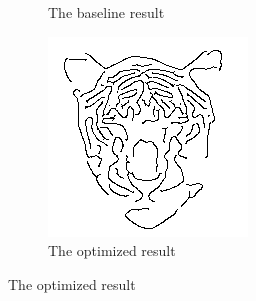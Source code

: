 \documentclass[10pt,final,journal]{IEEEtran}
\begin{document}
\begin{figure}[h!]
\begin{subfigure}[b]{0.3\textwidth}
            \caption{The baseline result}
            \label{fig:app_tiger_baseline}
    \end{subfigure}
    \begin{subfigure}[b]{0.3\textwidth}
            \includegraphics[width=\textwidth]{tiger_out}
            \caption{The optimized result}
            \label{fig:app_tiger_out}
    \end{subfigure}


\end{figure}
\end{document}
